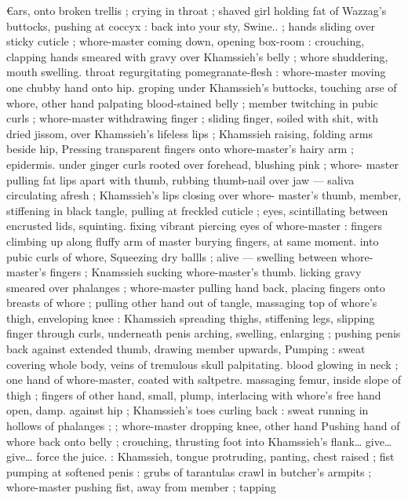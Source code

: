 €ars, onto broken trellis ; crying in throat ; shaved girl holding fat of 
Wazzag's buttocks, pushing at coccyx : {\td} {\gl}{\td} back into your sty, 
Swine..{\gr} ; hands sliding over sticky cuticle ; whore-master coming 
down, opening box-room : crouching, clapping hands smeared with 
gravy over Khamssieh's belly ; whore shuddering, mouth swelling. 
throat regurgitating pomegranate-flesh : whore-master moving one 
chubby hand onto hip. groping under Khamssieh's buttocks, touching 
arse of whore, other hand palpating blood-stained belly ; member 
twitching in pubic curls ; whore-master withdrawing finger ; sliding 
finger, soiled with shit, with dried jissom, over Khamssieh's lifeless 
lips ; Khamssieh raising, folding arms beside hip, Pressing 
transparent fingers onto whore-master's hairy arm ; epidermis. 
under ginger curls rooted over forehead, blushing pink ; whore- 
master pulling fat lips apart with thumb, rubbing thumb-nail over jaw 
--- saliva circulating afresh ; Khamssieh's lips closing over whore- 
master's thumb, member, stiffening in black tangle, pulling at 
freckled cuticle ; eyes, scintillating between encrusted lids, squinting. 
fixing vibrant piercing eyes of whore-master : fingers climbing up 
along fluffy arm of master burying fingers, at same moment. into 
pubic curls of whore, Squeezing dry ballls ; alive --- swelling between 
whore-master's fingers ; Knamssieh sucking whore-master's thumb. 
licking gravy smeared over phalanges ; whore-master pulling hand 
back, placing fingers onto breasts of whore ; pulling other hand out 
of tangle, massaging top of whore's thigh, enveloping knee : 
Khamssieh spreading thighs, stiffening legs, slipping finger through 
curls, underneath penis arching, swelling, enlarging ; pushing penis 
back against extended thumb, drawing member upwards, Pumping : 
sweat covering whole body, veins of tremulous skull palpitating. 
blood glowing in neck ; one hand of whore-master, coated with 
saltpetre. massaging femur, inside slope of thigh ; fingers of other 
hand, small, plump, interlacing with whore's free hand open, damp. 
against hip ; Khamssieh's toes curling back : sweat running in 
hollows of phalanges ; ; whore-master dropping knee, other hand 
Pushing hand of whore back onto belly ; crouching, thrusting foot 
into Khamssieh's flank{\ldots} {\gl} give{\ldots} give{\ldots} force the juice. {\gr} : 
Khamssieh, tongue protruding, panting, chest raised ; fist pumping 
at softened penis{\td} : {\gl}{\td} grubs of tarantulas crawl in butcher's 
armpits{\td} {\gr} ; whore-master pushing fist, away from member ; tapping 
